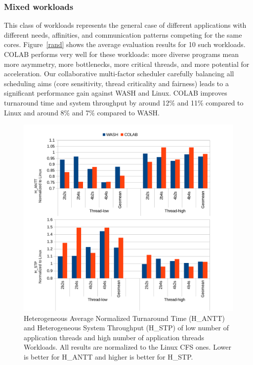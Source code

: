 \subsubsection{Mixed workloads}
This class of workloads represents the general case of different applications with different needs, affinities, and communication patterns competing for the same cores. Figure~\ref{rand} shows the average evaluation results for 10 such workloads. COLAB performs very well for these workloads: more diverse programs mean more asymmetry, more bottlenecks, more critical threads, and more potential for acceleration. Our collaborative multi-factor scheduler carefully balancing all scheduling aims (core sensitivity, thread criticality and fairness) leads to a significant performance gain against WASH and Linux. COLAB improves turnaround time and system throughput by around 12\% and 11\% compared to Linux and around 8\% and 7\% compared to WASH.

\begin{figure}
\centering
\includegraphics[scale=0.55]{figures/nthread.pdf}
\caption{Heterogeneous Average Normalized Turnaround Time (H\_ANTT) and Heterogeneous System Throughput (H\_STP) of low number of application threads and high number of application threads Workloads. All results are normalized to the Linux CFS ones. Lower is better for H\_ANTT and higher is better for H\_STP.}
\label{nthread}
\end{figure}


